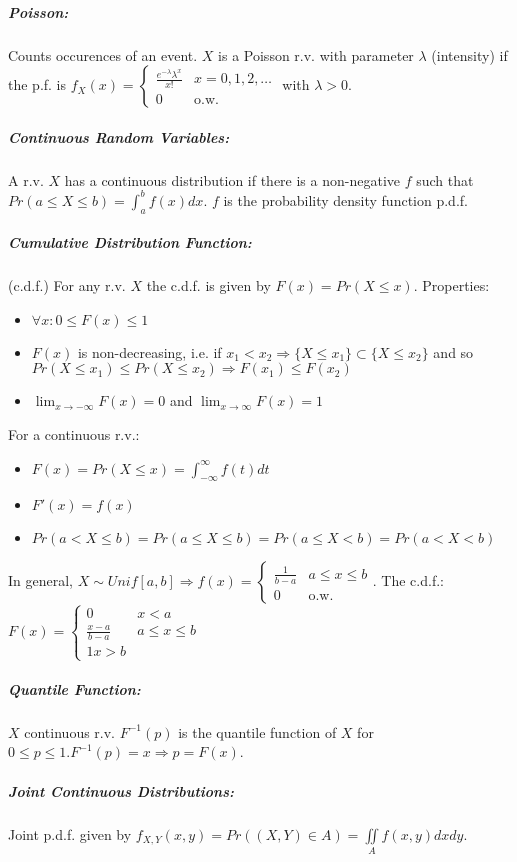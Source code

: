 \documentclass[landscape,10pt]{article}
\begin{document}
\begin{multicols}{3}
            \subparagraph*{Poisson: }
                    Counts occurences of an event. $X$ is a Poisson r.v. with parameter $\lambda$ (intensity) if the p.f. is $f_X(x) = \begin{cases} \frac{e^{-\lambda}\lambda^x}{x!} & x=0,1,2,\ldots \\ 0 & \text{o.w.} \end{cases}$ with $\lambda>0$.
            \subparagraph*{Continuous Random Variables: }
                    A r.v. $X$ has a continuous distribution if there is a non-negative $f$ such that $Pr(a \leq X \leq b) = \int_{a}^{b} f(x)dx$. $f$ is the probability density function p.d.f. 
            \subparagraph*{Cumulative Distribution Function: } 
                    (c.d.f.) For any r.v. $X$ the c.d.f. is given by $F(x) = Pr(X \leq x)$. Properties: \begin{itemize}
                        \item[] $\forall x: 0 \leq F(x) \leq 1$
                        \item[] $F(x)$ is non-decreasing, i.e. if $x_1 < x_2 \Rightarrow \{X \leq x_1 \} \subset \{X \leq x_2 \}$ and so $Pr(X \leq x_1) \leq Pr(X \leq x_2) \Rightarrow F(x_1) \leq F(x_2)$
                        \item[] $\lim_{x \to -\infty} F(x) = 0$ and $\lim_{x \to \infty} F(x) = 1$
                    \end{itemize}
                    For a continuous r.v.:
                    \begin{itemize}
                        \item[] $F(x) = Pr(X \leq x) = \int_{-\infty}^{\infty}f(t)dt$
                        \item[] $F'(x) = f(x)$
                        \item[] $Pr(a < X \leq b) = Pr(a \leq X \leq b) = Pr(a \leq X < b) = Pr(a < X < b)$
                    \end{itemize}
                In general, $X \sim Unif[a,b] \Rightarrow f(x) = \begin{cases} \frac{1}{b-a} & a \leq x \leq b \\ 0 & \text{o.w.} \end{cases}$. The c.d.f.: $F(x) = \begin{cases} 0 & x < a \\ \frac{x-a}{b-a} & a \leq x \leq b \\ 1 x > b \end{cases}$
                    \subparagraph*{Quantile Function: }
                        $X$ continuous r.v. $F^{-1}(p)$ is the quantile function of $X$ for $0 \leq p \leq 1. F^{-1}(p) = x \Rightarrow p = F(x)$.

                    \subparagraph*{Joint Continuous Distributions: }
                        Joint p.d.f. given by $f_{X,Y}(x,y) = Pr((X,Y) \in A) = \iint\limits_{A} f(x,y)dxdy$.
                        
                \end{multicols}
\end{document}

